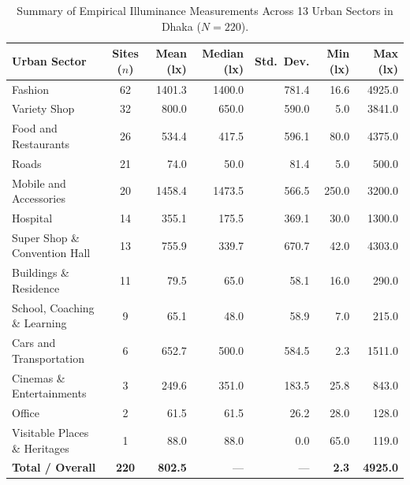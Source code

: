 \documentclass[11pt,a4paper]{article}
\begin{document}
\begin{table}[tbp]
\centering
\caption{Summary of Empirical Illuminance Measurements Across 13 Urban Sectors in Dhaka (\(N = 220\)). }
\label{tab:dhaka_summary}
\small
\setlength{\tabcolsep}{5pt}
\begin{tabular}{l c r r r r r}
\toprule
\textbf{Urban Sector} & \textbf{Sites (\(n\))} & \textbf{Mean (lx)} & \textbf{Median (lx)} & \textbf{Std.\ Dev.} & \textbf{Min (lx)} & \textbf{Max (lx)} \\
\midrule
Fashion & 62 & 1401.3 & 1400.0 & 781.4 & 16.6 & 4925.0 \\
Variety Shop & 32 & 800.0 & 650.0 & 590.0 & 5.0 & 3841.0 \\
Food and Restaurants & 26 & 534.4 & 417.5 & 596.1 & 80.0 & 4375.0 \\
Roads & 21 & 74.0 & 50.0 & 81.4 & 5.0 & 500.0 \\
Mobile and Accessories & 20 & 1458.4 & 1473.5 & 566.5 & 250.0 & 3200.0 \\
Hospital & 14 & 355.1 & 175.5 & 369.1 & 30.0 & 1300.0 \\
Super Shop \& Convention Hall & 13 & 755.9 & 339.7 & 670.7 & 42.0 & 4303.0 \\
Buildings \& Residence & 11 & 79.5 & 65.0 & 58.1 & 16.0 & 290.0 \\
School, Coaching \& Learning & 9 & 65.1 & 48.0 & 58.9 & 7.0 & 215.0 \\
Cars and Transportation & 6 & 652.7 & 500.0 & 584.5 & 2.3 & 1511.0 \\
Cinemas \& Entertainments & 3 & 249.6 & 351.0 & 183.5 & 25.8 & 843.0 \\
Office & 2 & 61.5 & 61.5 & 26.2 & 28.0 & 128.0 \\
Visitable Places \& Heritages & 1 & 88.0 & 88.0 & 0.0 & 65.0 & 119.0 \\
\midrule
\textbf{Total / Overall} & \textbf{220} & \textbf{802.5} & --- & --- & \textbf{2.3} & \textbf{4925.0} \\
\bottomrule
\end{tabular}
\end{table}
\end{document}

